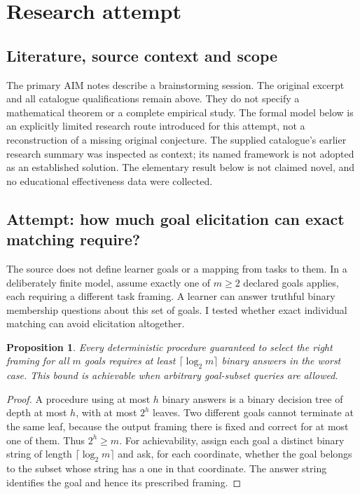 \documentclass[11pt]{article}
\newtheorem{proposition}{Proposition}
\begin{document}
\section{Research attempt}
\subsection{Literature, source context and scope}
The primary AIM notes describe a brainstorming session. The original excerpt and all catalogue qualifications remain above. They do not specify a mathematical theorem or a complete empirical study. The formal model below is an explicitly limited research route introduced for this attempt, not a reconstruction of a missing original conjecture. The supplied catalogue's earlier research summary was inspected as context; its named framework is not adopted as an established solution. The elementary result below is not claimed novel, and no educational effectiveness data were collected.

\subsection{Attempt: how much goal elicitation can exact matching require?}
The source does not define learner goals or a mapping from tasks to them. In a deliberately finite model, assume exactly one of $m\ge2$ declared goals applies, each requiring a different task framing. A learner can answer truthful binary membership questions about this set of goals. I tested whether exact individual matching can avoid elicitation altogether.
\begin{proposition}
Every deterministic procedure guaranteed to select the right framing for all $m$ goals requires at least $\lceil\log_2m\rceil$ binary answers in the worst case. This bound is achievable when arbitrary goal-subset queries are allowed.
\end{proposition}
\begin{proof}
A procedure using at most $h$ binary answers is a binary decision tree of depth at most $h$, with at most $2^h$ leaves. Two different goals cannot terminate at the same leaf, because the output framing there is fixed and correct for at most one of them. Thus $2^h\ge m$. For achievability, assign each goal a distinct binary string of length $\lceil\log_2m\rceil$ and ask, for each coordinate, whether the goal belongs to the subset whose string has a one in that coordinate. The answer string identifies the goal and hence its prescribed framing.
\end{proof}
\end{document}
